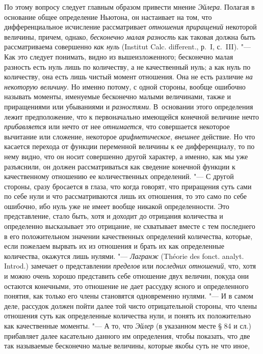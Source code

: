 По этому вопросу следует главным образом привести мнение
{\em Эйлера}. Полагая в основание общее определение
Ньютона, он настаивает на том, что дифференциальное исчисление рассматривает
{\em отношения приращений} некоторой величины, причем,
однако, {\em бесконечно малая разность} как таковая
должна быть рассматриваема совершенно {\em как нуль}
(Institut Calc. different., р.~I, с.~III).
"--- Как это следует понимать, видно из
вышеизложенного; бесконечно малая разность есть нуль лишь по количеству, а
не качественный нуль; а как нуль по количеству, она есть лишь чистый момент
отношения. Она не есть различие {\em на некоторую
величину}. Но именно потому, с одной стороны, вообще ошибочно называть
моменты, именуемые бесконечно малыми величинами, также и приращениями или
убываниями и {\em разностями}. В~основании этого
определения лежит предположение, что к первоначально имеющейся конечной
величине нечто {\em прибавляется} или нечто от нее
{\em отнимается}, что совершается некоторое вычитание
или сложение, некоторое {\em арифметическое},
{\em внешнее} действие. Но что касается перехода от
функции переменной величины к ее дифференциалу, то по нему видно, что он
носит совершенно другой характер, а именно, как мы уже разъяснили, он
должен рассматриваться как сведение конечной функции к качественному
отношению ее количественных определений. "--- С другой стороны, сразу
бросается в глаза, что когда говорят, что приращения суть сами по себе нули
и что рассматриваются лишь их отношения, то это само по себе ошибочно, ибо
нуль уже не имеет вообще никакой определенности. Это представление, стало
быть, хотя и доходит до отрицания количества и определенно высказывает это
отрицание, не схватывает вместе с тем последнего в его положительном
значении качественных определений количества, которые, если пожелаем
вырвать их из отношения и брать их как определенные количества, окажутся
лишь нулями. "--- {\em Лагранж} (Théorie des fonct. analyt. Introd.)
замечает о представлении {\em пределов} или {\em последних
отношений}, что, хотя и можно очень хорошо представить себе отношение двух
величин, покуда они остаются конечными, это отношение не дает рассудку
ясного и определенного понятия, как только его члены становятся
одновременно нулями. "--- И в самом деле, рассудок должен пойти далее той
чисто отрицательной стороны, что члены отношения суть как определенные
количества нули, и понять их положительно как качественные моменты. "--- А то,
что {\em Эйлер} (в указанном месте § 84 и сл.)
прибавляет далее касательно данного им определения, чтобы показать, что две
так называемые бесконечно малые величины, которые якобы суть не что иное,
